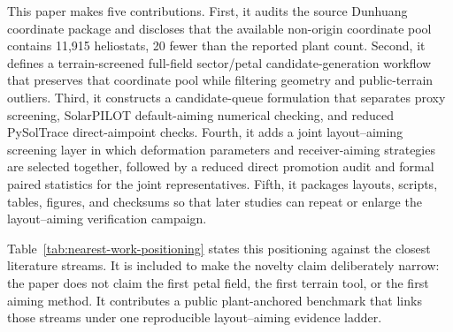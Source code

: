 \documentclass[final,3p,times]{elsarticle}
\begin{document}
This paper makes five contributions. First, it audits the source Dunhuang coordinate package and discloses that the available non-origin coordinate pool contains 11,915 heliostats, 20 fewer than the reported plant count. Second, it defines a terrain-screened full-field sector/petal candidate-generation workflow that preserves that coordinate pool while filtering geometry and public-terrain outliers. Third, it constructs a candidate-queue formulation that separates proxy screening, SolarPILOT default-aiming numerical checking, and reduced PySolTrace direct-aimpoint checks. Fourth, it adds a joint layout--aiming screening layer in which deformation parameters and receiver-aiming strategies are selected together, followed by a reduced direct promotion audit and formal paired statistics for the joint representatives. Fifth, it packages layouts, scripts, tables, figures, and checksums so that later studies can repeat or enlarge the layout--aiming verification campaign.

Table~\ref{tab:nearest-work-positioning} states this positioning against the closest literature streams. It is included to make the novelty claim deliberately narrow: the paper does not claim the first petal field, the first terrain tool, or the first aiming method. It contributes a public plant-anchored benchmark that links those streams under one reproducible layout--aiming evidence ladder.
\end{document}
